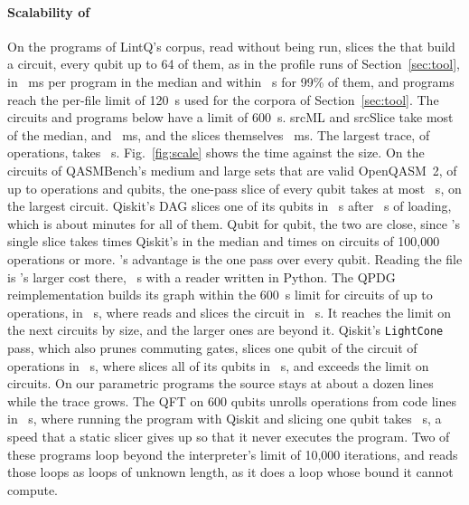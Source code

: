 \paragraph*{Scalability of \tool{}}
On the \numScaleSOneFiles{} programs of LintQ's corpus, read without being run, \tool{} slices the
\numScaleSOneSliced{} that build a circuit, every qubit up to 64 of them, as in the profile runs of Section~\ref{sec:tool}, in \numScaleSOneMedianMs{}~ms per program
in the median and within \numScaleSOneNinetyNine{}~s for 99\% of them, and \numScaleSOneTimeouts{} programs reach
the per-file limit of 120~s used for the corpora of Section~\ref{sec:tool}. The circuits and programs below
have a limit of 600~s. srcML and srcSlice take most of the median, \numScaleSOneSrcmlMs{} and
\numScaleSOneSrcsliceMs{}~ms, and the slices themselves \numScaleSOneSliceMs{}~ms. The largest trace, of
\numScaleSOneMaxOps{} operations, takes \numScaleSOneMaxOpsS{}~s. Fig.~\ref{fig:scale} shows the time against the
size. On the \numScaleQbRead{} circuits of QASMBench's medium and large sets that are valid OpenQASM~2, of up to
\numScaleQbMaxOps{} operations and \numScaleQbMaxQubits{} qubits, the one-pass slice of every qubit takes at most
\numScaleQbAllS{}~s, on the largest circuit. Qiskit's DAG slices one of its \numScaleQbMaxOpsQubits{} qubits in
\numScaleQbDagOneS{}~s after \numScaleQbDagLoadS{}~s of loading, which is about \numScaleQbDagAllMin{} minutes for
all of them. Qubit for qubit, the two are close, since \tool{}'s single slice takes \numScaleOneRatio{} times
Qiskit's in the median and \numScaleOneRatioBig{} times on circuits of 100{,}000 operations or more. \tool{}'s
advantage is the one pass over every qubit. Reading the file is \tool{}'s larger cost there, \numScaleQbReadS{}~s with a reader written in Python.
The QPDG reimplementation builds its graph within the 600~s limit for circuits of up to \numScaleQpdgMaxOps{}
operations, in \numScaleQpdgMaxS{}~s, where \tool{} reads and slices the circuit in \numScaleQpdgSqS{}~s. It reaches the
limit on the next circuits by size, and the \numScaleQpdgOver{} larger ones are beyond it. Qiskit's \texttt{LightCone} pass, which also prunes commuting gates, slices one qubit of the circuit of
\numScaleLcMaxOps{} operations in \numScaleLcMaxS{}~s, where \tool{} slices all \numScaleLcQubits{} of its
qubits in \numScaleLcSqS{}~s, and exceeds the limit on \numScaleLcOver{} circuits. On our parametric programs the source stays at
about a dozen lines while the trace grows. The QFT on 600 qubits unrolls \numScaleQftOps{} operations from
\numScaleQftLines{} code lines in \numScaleQftS{}~s, where running the program with Qiskit and slicing one qubit
takes \numScaleQftRunS{}~s, a speed that a static slicer gives up so that it never executes the program. Two of these programs loop beyond the interpreter's limit of 10{,}000 iterations, and \tool{} reads those loops
as loops of unknown length, as it does a loop whose bound it cannot compute.
